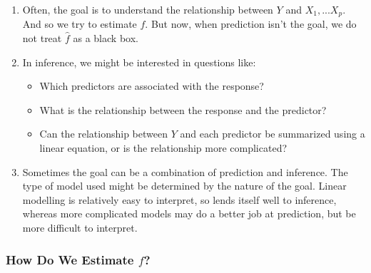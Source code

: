 \documentclass[10pt]{article}
\newcommand{\fhat}{\hat{f}}
\begin{document}
\begin{enumerate}
	\item Often, the goal is to understand the relationship between $Y$ and $X_1, ... X_p$. And so we try to estimate $f$.  But now, when prediction isn't the goal, we do not treat $\fhat$ as a black box.  
	
	\item In inference, we might be interested in questions like:
	\begin{itemize}
		\item Which predictors are associated with the response?
		\item What is the relationship between the response and the predictor?
		\item Can the relationship between $Y$ and each predictor be summarized using a linear equation, or is the relationship more complicated?
	\end{itemize}
	
	\item Sometimes the goal can be a combination of prediction and inference.  The type of model used might be determined by the nature of the goal.  Linear modelling is relatively easy to interpret, so lends itself well to inference, whereas more complicated models may do a better job at prediction, but be more difficult to interpret.
\end{enumerate} 

\vspace{.2in} 

\subsubsection{How Do We Estimate $f$?} 
\end{document}
